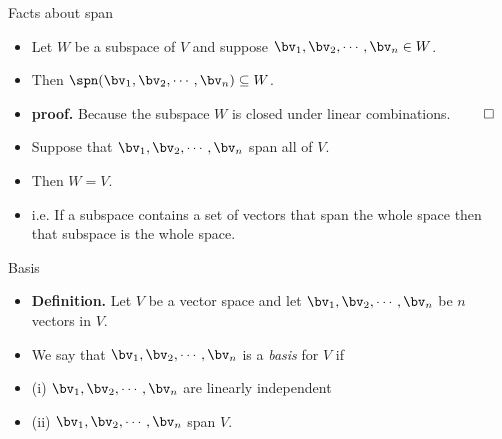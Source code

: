 \documentclass{beamer}
\begin{document}
\begin{frame}{Facts about span}

\begin{itemize}
\item Let $W$ be a subspace of $V$ and suppose $\bv_1,\bv_2,\cdots,\bv_n\in W$.\
\item Then $\spn(\bv_1,\bv_2,\cdots,\bv_n)\subseteq W$.
\item \textbf{proof.} Because the subspace $W$ is closed under linear combinations. $\qed$
\item Suppose that $\bv_1,\bv_2,\cdots,\bv_n$ span all of $V$.
\item Then $W=V$.
\item i.e. If a subspace contains a set of vectors that span the whole space then
that subspace is the whole space.
\end{itemize}

\end{frame}



\begin{frame}{Basis}

\begin{itemize}
\item \textbf{Definition.} Let $V$ be a vector space and let $\bv_1,\bv_2,\cdots,\bv_n$ be $n$ vectors in $V$.
\item We say that $\bv_1,\bv_2,\cdots,\bv_n$ is a \emph{basis} for $V$ if
\item (i) $\bv_1,\bv_2,\cdots,\bv_n$ are linearly independent
\item (ii) $\bv_1,\bv_2,\cdots,\bv_n$ span $V$.
\end{itemize}
\end{frame}
\end{document}
